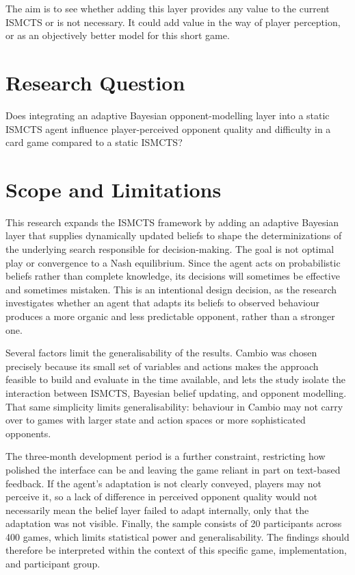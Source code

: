 \documentclass[12pt,a4paper,oneside]{report}
\begin{document}
The aim is to see whether adding this layer provides any value to the current ISMCTS or is not necessary. It could add value in the way of player perception, or as an objectively better model for this short game.

\section{Research Question}

Does integrating an adaptive Bayesian opponent-modelling layer into a static ISMCTS agent influence player-perceived opponent quality and difficulty in a card game compared to a static ISMCTS?

\section{Scope and Limitations}

This research expands the ISMCTS framework by adding an adaptive Bayesian layer that supplies dynamically updated beliefs to shape the determinizations of the underlying search responsible for decision-making. The goal is not optimal play or convergence to a Nash equilibrium. Since the agent acts on probabilistic beliefs rather than complete knowledge, its decisions will sometimes be effective and sometimes mistaken. This is an intentional design decision, as the research investigates whether an agent that adapts its beliefs to observed behaviour produces a more organic and less predictable opponent, rather than a stronger one.

Several factors limit the generalisability of the results. Cambio was chosen precisely because its small set of variables and actions makes the approach feasible to build and evaluate in the time available, and lets the study isolate the interaction between ISMCTS, Bayesian belief updating, and opponent modelling. That same simplicity limits generalisability: behaviour in Cambio may not carry over to games with larger state and action spaces or more sophisticated opponents.

The three-month development period is a further constraint, restricting how polished the interface can be and leaving the game reliant in part on text-based feedback. If the agent's adaptation is not clearly conveyed, players may not perceive it, so a lack of difference in perceived opponent quality would not necessarily mean the belief layer failed to adapt internally, only that the adaptation was not visible. Finally, the sample consists of 20 participants across 400 games, which limits statistical power and generalisability. The findings should therefore be interpreted within the context of this specific game, implementation, and participant group. 
\end{document}
